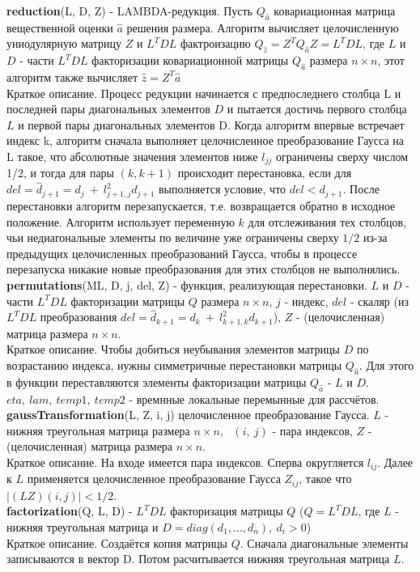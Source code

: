 \documentclass[12pt]{matmex-diploma}
\begin{document}
\textbf{reduction}(L, D, Z) - LAMBDA-редукция. Пусть $Q_{\hat{a}}$ ковариационная матрица 
вещественной оценки $\hat{a}$ решения размера. Алгоритм вычисляет целочисленную 
униодулярную матрицу $Z$ и $L^{T}DL$ фактроизацию 
$Q_{\hat{z}} = Z^TQ_{\hat{a}}Z = L^{T}DL$, где $L$ и $D$ - части $L^{T}DL$ 
факторизации ковариационной матрицы $Q_{\hat{a}}$ размера $n \times n$, этот 
алгоритм также вычисляет $\hat{z}=Z^T\hat{a}$ \\ 
Краткое описание. Процесс редукции начинается с предпоследнего столбца L и последней пары
диагональных элементов $D$ и пытается достичь первого столбца $L$ и первой пары диагональных элементов D. Когда алгоритм впервые встречает индекс k, алгоритм сначала выполняет
целочисленное преобразование Гаусса на L такое, что абсолютные значения элементов ниже $l_{jj}$
ограничены сверху числом 1/2, и тогда для пары $(k, k + 1)$ происходит перестановка, если для $del = \hat{d}_{j+1} = d_j \ + \ l^2_{j+1,j}d_{j+1}$ выполняется условие, что $del < d_{j+1}$. После перестановки алгоритм перезапускается, т.е. возвращается
обратно в исходное положение. Алгоритм использует переменную $k$ для отслеживания
тех столбцов, чьи недиагональные элементы по величине уже ограничены сверху $1/2$ из-за
предыдущих целочисленных преобразований Гаусса, чтобы в процессе перезапуска никакие новые преобразования для этих столбцов не выполнялись.\\ 

\textbf{permutations}(ML, D, j, del, Z) - функция, реализующая перестановки. 
$L$ и $D$ - части $L^{T}DL$ факторизации матрицы $Q$ размера $n \times n$, $j$ 
- индекс, $del$ - скаляр (из $L^{T}DL$ преобразования 
$del = \hat{d}_{k+1} = d_k \ + \ l^2_{k+1,k}d_{k+1}$), $Z$ - (целочисленная) 
матрица размера $n \times n$.  \\
Краткое описание. Чтобы добиться неубывания элементов матрицы $D$ по возрастанию
индекса, нужны симметричные перестановки матрицы $Q_{\hat{a}}$. Для этого в 
функции переставляются элементы факторизации матрицы $Q_{\hat{a}}$ - $L$ и $D$. 
$eta, \ lam , \ temp1, \ temp2 $ - времнные локальные перемынные для рассчётов. \\ 

\textbf{gaussTransformation}(L, Z, i, j) \- целочисленное преобразование Гаусса.
$L$ - нижняя треугольная матрица размера $n \times n$, \ $(i, \ j)$ - пара индексов, 
$Z$ - (целочисленная) матрица размера $n \times n$. \\ 
Краткое описание. На входе имеется пара индексов. Сперва округляется $l_{ij}$. Далее к $L$ применяется целочисленное преобразование Гаусса $Z_{ij}$, такое что $|(LZ)(i,j)|<1/2$. \\

\textbf{factorization}(Q, L, D) - $L^{T}DL$ факторизация матрицы $Q$ ($Q = L^{T}DL$, 
где $L$ - нижняя треугольная матрица и $D = diag(d_{1}, ..., d_{n}) , \ d_{i} > 0$) \\
Краткое описание. Создаётся копия матрицы $Q$. Сначала диагональные элементы записываются в вектор D. Потом расчитывается нижняя треугольная матрица $L$. \\



\setmonofont[Mapping=tex-text]{CMU Typewriter Text}


\end{document}
